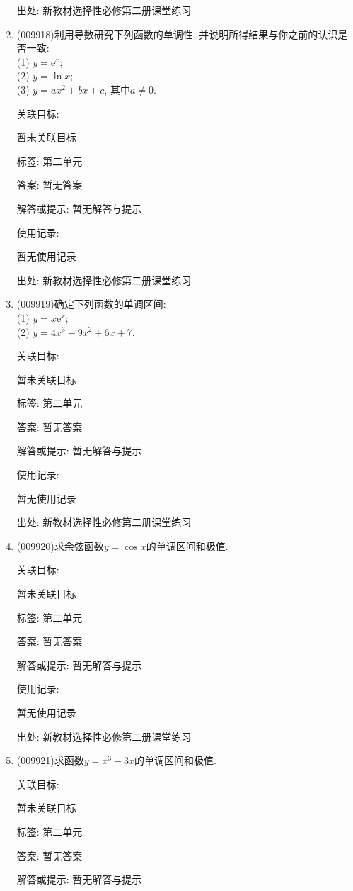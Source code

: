 \documentclass[10pt,a4paper]{article}
\begin{document}
\begin{enumerate}[1.]
出处: 新教材选择性必修第二册课堂练习
\item { (009918)}利用导数研究下列函数的单调性, 并说明所得结果与你之前的认识是否一致:\\
(1) $y=\mathrm{e}^x$;\\
(2) $y=\ln x$;\\
(3) $y=ax^2+bx+c$, 其中$a\ne 0$.


关联目标:

暂未关联目标



标签: 第二单元

答案: 暂无答案

解答或提示: 暂无解答与提示

使用记录:

暂无使用记录


出处: 新教材选择性必修第二册课堂练习
\item { (009919)}确定下列函数的单调区间:\\
(1) $y=x\mathrm{e}^x$;\\
(2) $y=4x^3-9x^2+6x+7$.


关联目标:

暂未关联目标



标签: 第二单元

答案: 暂无答案

解答或提示: 暂无解答与提示

使用记录:

暂无使用记录


出处: 新教材选择性必修第二册课堂练习
\item { (009920)}求余弦函数$y=\cos x$的单调区间和极值.


关联目标:

暂未关联目标



标签: 第二单元

答案: 暂无答案

解答或提示: 暂无解答与提示

使用记录:

暂无使用记录


出处: 新教材选择性必修第二册课堂练习
\item { (009921)}求函数$y=x^3-3x$的单调区间和极值.


关联目标:

暂未关联目标



标签: 第二单元

答案: 暂无答案

解答或提示: 暂无解答与提示


\end{enumerate}
\end{document}
